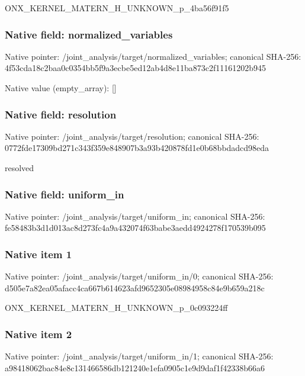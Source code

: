 \documentclass[10pt,a4paper]{article}
\begin{document}
\begingroup\raggedright\sloppy ONX\_\allowbreak{}KERNEL\_\allowbreak{}MATERN\_\allowbreak{}H\_\allowbreak{}UNKNOWN\_\allowbreak{}p\_\allowbreak{}4ba56f91f5\par\endgroup

\subsubsection{Native field: normalized\_\allowbreak{}variables}
Native pointer: /joint\_\allowbreak{}analysis/target/normalized\_\allowbreak{}variables; canonical SHA-256: 4f53cda18c2baa0c0354bb5f9a3ecbe5ed12ab4d8e11ba873c2f11161202b945

Native value (empty\_\allowbreak{}array): []

\subsubsection{Native field: resolution}
Native pointer: /joint\_\allowbreak{}analysis/target/resolution; canonical SHA-256: 0772fde17309bd271c343f359e848907b3a93b420878fd1e0b68bbdadcd98eda

\begingroup\raggedright\sloppy resolved\par\endgroup

\subsubsection{Native field: uniform\_\allowbreak{}in}
Native pointer: /joint\_\allowbreak{}analysis/target/uniform\_\allowbreak{}in; canonical SHA-256: fe58483b3d1d013ac8d273fc4a9a432074f63babe3aedd4924278f170539b095

\subsubsection{Native item 1}
Native pointer: /joint\_\allowbreak{}analysis/target/uniform\_\allowbreak{}in/0; canonical SHA-256: d505e7a82ea05afacc4ca667b614623afd9652305e08984958c84e9b659a218c

\begingroup\raggedright\sloppy ONX\_\allowbreak{}KERNEL\_\allowbreak{}MATERN\_\allowbreak{}H\_\allowbreak{}UNKNOWN\_\allowbreak{}p\_\allowbreak{}0c093224ff\par\endgroup

\subsubsection{Native item 2}
Native pointer: /joint\_\allowbreak{}analysis/target/uniform\_\allowbreak{}in/1; canonical SHA-256: a98418062bac84e8c131466586db121240e1efa0905c1e9d9daf1f42338b66a6
\end{document}
